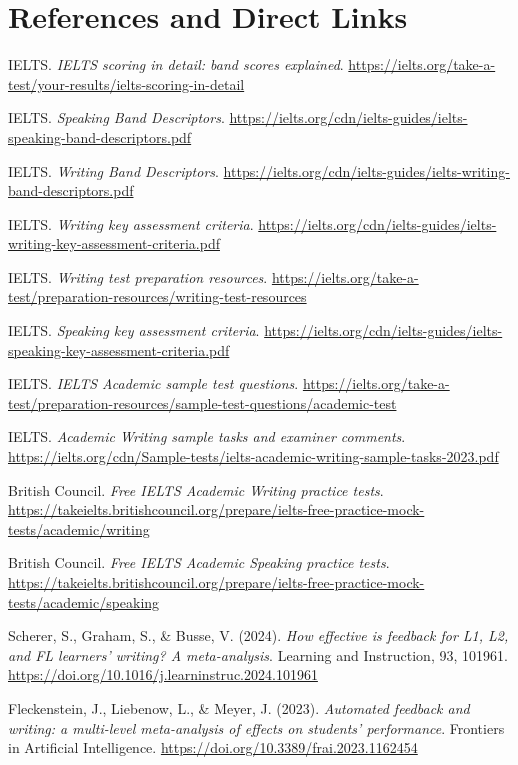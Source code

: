 \documentclass[11pt,a4paper]{article}
\begin{document}
\section{References and Direct Links}
\small
\begin{enumerate}[label={[R\arabic*]},leftmargin=2.4em]
\item IELTS. \textit{IELTS scoring in detail: band scores explained}. \url{https://ielts.org/take-a-test/your-results/ielts-scoring-in-detail}
\item IELTS. \textit{Speaking Band Descriptors}. \url{https://ielts.org/cdn/ielts-guides/ielts-speaking-band-descriptors.pdf}
\item IELTS. \textit{Writing Band Descriptors}. \url{https://ielts.org/cdn/ielts-guides/ielts-writing-band-descriptors.pdf}
\item IELTS. \textit{Writing key assessment criteria}. \url{https://ielts.org/cdn/ielts-guides/ielts-writing-key-assessment-criteria.pdf}
\item IELTS. \textit{Writing test preparation resources}. \url{https://ielts.org/take-a-test/preparation-resources/writing-test-resources}
\item IELTS. \textit{Speaking key assessment criteria}. \url{https://ielts.org/cdn/ielts-guides/ielts-speaking-key-assessment-criteria.pdf}
\item IELTS. \textit{IELTS Academic sample test questions}. \url{https://ielts.org/take-a-test/preparation-resources/sample-test-questions/academic-test}
\item IELTS. \textit{Academic Writing sample tasks and examiner comments}. \url{https://ielts.org/cdn/Sample-tests/ielts-academic-writing-sample-tasks-2023.pdf}
\item British Council. \textit{Free IELTS Academic Writing practice tests}. \url{https://takeielts.britishcouncil.org/prepare/ielts-free-practice-mock-tests/academic/writing}
\item British Council. \textit{Free IELTS Academic Speaking practice tests}. \url{https://takeielts.britishcouncil.org/prepare/ielts-free-practice-mock-tests/academic/speaking}
\item Scherer, S., Graham, S., \& Busse, V. (2024). \textit{How effective is feedback for L1, L2, and FL learners' writing? A meta-analysis}. Learning and Instruction, 93, 101961. \url{https://doi.org/10.1016/j.learninstruc.2024.101961}
\item Fleckenstein, J., Liebenow, L., \& Meyer, J. (2023). \textit{Automated feedback and writing: a multi-level meta-analysis of effects on students' performance}. Frontiers in Artificial Intelligence. \url{https://doi.org/10.3389/frai.2023.1162454}

\end{enumerate}
\end{document}
